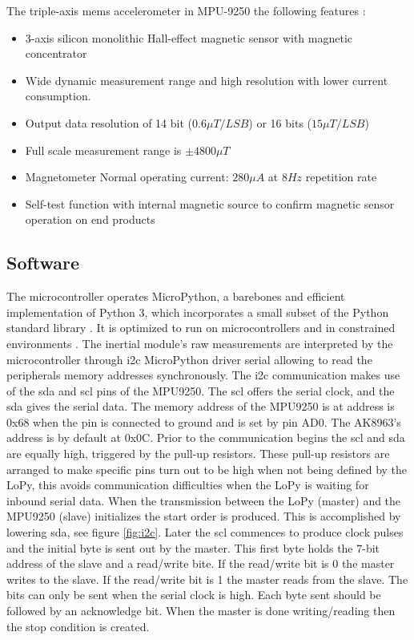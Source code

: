 The triple-axis \acrshort{mems} accelerometer in MPU-9250 the following features \cite{mpu9250specification}:
\begin{itemize}
    \item 3-axis silicon monolithic Hall-effect magnetic sensor with magnetic concentrator
    \item Wide dynamic measurement range and high resolution with lower current consumption.
    \item Output data resolution of 14 bit ($0.6 \mu T/LSB$) or 16 bits ($15 \mu T/LSB$)
    \item Full scale measurement range is $\pm 4800 \mu T$
    \item Magnetometer Normal operating current: $280\mu A$ at $8 Hz$ repetition rate
    \item Self-test function with internal magnetic source to confirm magnetic sensor operation on end products
\end{itemize}



\subsection{Software}

The microcontroller operates MicroPython, a barebones and efficient implementation of Python 3, which incorporates a small subset of the Python standard library \cite{micropython}. It is optimized to run on microcontrollers and in constrained environments \cite{tollervey2017programming}. The inertial module's raw measurements are interpreted by the microcontroller through \acrfull{i2c} MicroPython driver serial allowing to read the peripherals memory addresses synchronously. The \acrshort{i2c} communication makes use of the \acrfull{sda} and \acrfull{scl} pins of the MPU9250. The \acrshort{scl} offers the serial clock, and the \acrshort{sda} gives the serial data. The memory address of the MPU9250 is at address is 0x68 when the pin is connected to ground and is set by pin AD0. The AK8963's address is by default at 0x0C. Prior to the communication begins the \acrshort{scl} and \acrshort{sda} are equally high, triggered by the pull-up resistors. These pull-up resistors are arranged to make specific pins turn out to be high when not being defined by the LoPy, this avoids communication difficulties when the LoPy is waiting for inbound serial data.
When the transmission between the LoPy (master) and the MPU9250 (slave) initializes the start order is produced. This is accomplished by lowering \acrshort{sda}, see figure \ref{fig:i2c}. Later the \acrshort{scl} commences to produce clock pulses and the initial byte is sent out by the master. This first byte holds the 7-bit address of the slave and a read/write bite. If the read/write bit is 0 the master writes to the slave. If the read/write bit is 1 the master reads from the slave. The bits can only be sent when the serial clock is high. Each byte sent should be followed by an acknowledge bit. When the master is done writing/reading then the stop condition is created.

